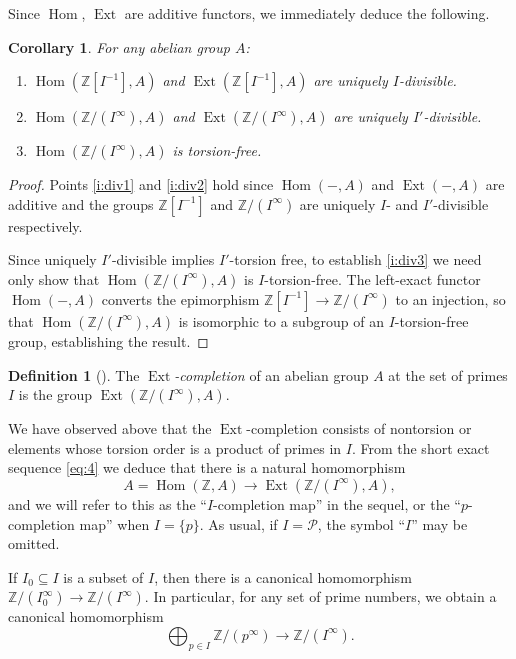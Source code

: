 \documentclass[11pt, oneside, dvipsnames, svgnames, table, final]{amsart}
\newcommand{\mathbx}[1]{\mathbb{#1}}
\theoremstyle{plain}
\newtheorem{corollary}[thm]{Corollary}
\theoremstyle{definition}
\newtheorem{definition}[thm]{Definition}
\theoremstyle{remark}
\newcommand{\Z}{\mathbx{Z}}
\newcommand{\Ext}{\operatorname{Ext}}
\newcommand{\Hom}{\operatorname{Hom}}
\newcommand{\sh}[1]{\mathcal{#1}}
\newcommand{\<}[1]{{\langle}#1 {\rangle}}
\newcommand{\Zpinf}{\Z/\left(p^\infty\right)}
\newcommand{\ZIinf}{\Z/\left(I^\infty\right)}
\begin{document}
Since $\Hom$, $\Ext$ are additive functors, we immediately deduce the following.
\begin{corollary}\label{cor:wereBulletPoints}
For any abelian group $A$:
\begin{enumerate}
\item\label{i:div1} $\Hom(\Z[I^{-1}], A)$ and $\Ext(\Z[I^{-1}], A)$ are uniquely $I$-divisible.
\item\label{i:div2} $\Hom(\ZIinf, A)$ and $\Ext(\ZIinf, A)$ are uniquely $I'$-divisible.
\item\label{i:div3} $\Hom(\ZIinf, A)$ is torsion-free.
\end{enumerate}
\end{corollary}
\begin{proof}
  Points \ref{i:div1} and \ref{i:div2} hold since $\Hom(-, A)$ and $\Ext(-,A)$ are additive and the groups $\Z[I^{-1}]$ and $\ZIinf$ are uniquely $I$- and $I'$-divisible respectively.

  Since uniquely $I'$-divisible implies $I'$-torsion free, to establish \ref{i:div3} we need only show that $\Hom(\ZIinf, A)$ is $I$-torsion-free. The left-exact functor $\Hom(-, A)$ converts the epimorphism $\Z[I^{-1}] \to \ZIinf$ to an injection, so that $\Hom(\ZIinf, A)$ is isomorphic to a subgroup of an $I$-torsion-free group, establishing the result.
\end{proof}

\begin{definition}[{\protect \cite{Bousfield1972}}]
  The \emph{$\Ext$-completion} of an abelian group $A$ at the set of primes $I$ is the group $\Ext(\ZIinf, A)$. 
\end{definition}
We have observed above that the $\Ext$-completion consists of nontorsion or elements whose torsion order is a product of primes in $I$. From the short exact sequence \eqref{eq:4} we deduce that there is a natural homomorphism
\[ A=\Hom(\Z,A) \to \Ext(\ZIinf, A), \]
and we will refer to this as the ``$I$-completion map'' in the sequel, or the ``$p$-completion map'' when $I=\{p\}$. As usual, if $I =\sh P$, the symbol ``$I$'' may be omitted.

If $I_0\subseteq I$ is a subset of $I$, then there is a canonical homomorphism $\Z/(I_0^\infty) \to \Z/(I^\infty)$. In particular, for any set of prime numbers, we obtain a canonical homomorphism
\begin{equation}
  \label{eq:5}
  \bigoplus_{p \in I} \Zpinf \to \ZIinf.
\end{equation}
\end{document}
